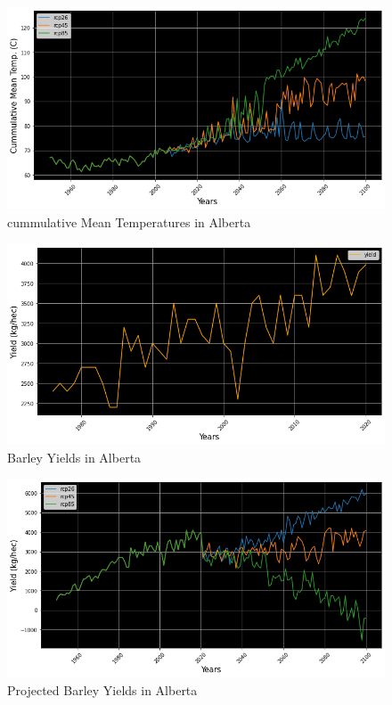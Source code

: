 \documentclass[11pt]{article}
\numberwithin{equation}{section}
\numberwithin{figure}{section}
\begin{document}
\begin{figure}[h!]
\centering
 \includegraphics[scale=0.4]{ABtemp}
 \caption{cummulative Mean Temperatures in Alberta}
 \label{ABmeantemp}
\end{figure}

\begin{figure}[h!]
\centering
 \includegraphics[scale=0.4]{AByield}
 \caption{Barley Yields in Alberta}
 \label{ABbarleyyields}
\end{figure}

\begin{figure}[h!]
 \centering
 \includegraphics[scale=0.4]{ABproj}
 \caption{Projected Barley Yields in Alberta}
 \label{ABprojections}
\end{figure}
\end{document}
